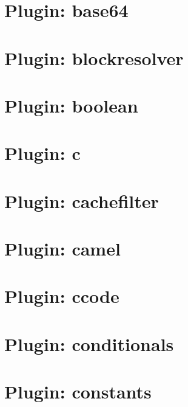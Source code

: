 \documentclass[twoside]{book}
\newcommand{\+}{\discretionary{\mbox{\scriptsize$\hookleftarrow$}}{}{}}
\begin{document}
\chapter{Plugin\+: base64}
\label{md_src_plugins_base64_README}

\chapter{Plugin\+: blockresolver}
\label{md_src_plugins_blockresolver_README}

\chapter{Plugin\+: boolean}
\label{md_src_plugins_boolean_README}

\chapter{Plugin\+: c}
\label{md_src_plugins_c_README}

\chapter{Plugin\+: cachefilter}
\label{md_src_plugins_cachefilter_README}

\chapter{Plugin\+: camel}
\label{md_src_plugins_camel_README}

\chapter{Plugin\+: ccode}
\label{md_src_plugins_ccode_README}

\chapter{Plugin\+: conditionals}
\label{md_src_plugins_conditionals_README}

\chapter{Plugin\+: constants}
\label{md_src_plugins_constants_README}

\end{document}

